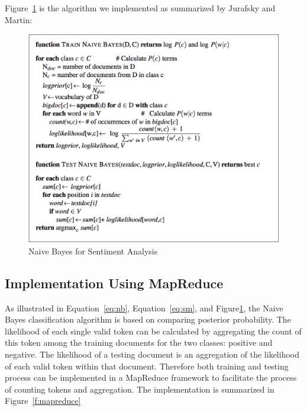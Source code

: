Figure~\ref{f:algo} is the algorithm we implemented as summarized by
Jurafsky and Martin:
\begin{figure}[!ht]
		\centering\includegraphics[width=\columnwidth]{images/algorithm.png}
		\caption{Naive Bayes for Sentiment 
		Analysis~\cite{hid-sp18-405-sentiment-jurafsky2009}}\label{f:algo}
\end{figure}

\subsection{Implementation Using MapReduce}

As illustrated in Equation~\ref{eq:nb}, Equation~\ref{eq:sm}, and
Figure\ref{f:algo}, the Naive Bayes classification algorithm is based
on comparing posterior probability. The likelihood of each single
valid token can be calculated by aggregating the count of this token
among the training documents for the two classes: positive and
negative. The likelihood of a testing document is an aggregation
of the likelihood of each valid token within that document. Therefore
both training and testing process can be implemented in a MapReduce
framework to facilitate the process of counting tokens and
aggregation. The implementation is summarized in Figure~\ref{f:mapreduce}

